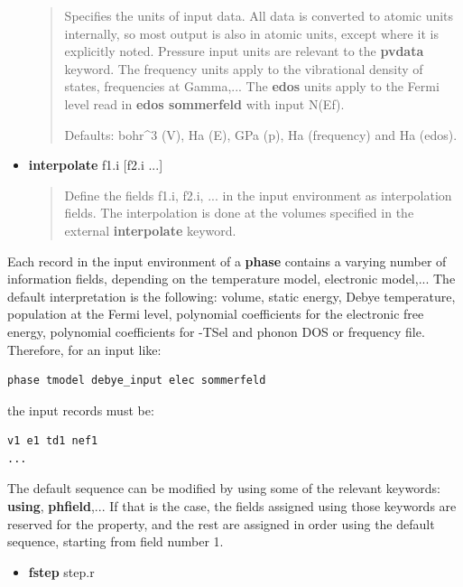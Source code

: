 \documentclass[a4paper]{article}
\begin{document}
\begin{itemize}
\begin{quote}
Specifies the units of input data. All data is converted to atomic
units internally, so most output is also in atomic units, except
where it is explicitly noted. Pressure input units are relevant to
the \textbf{pvdata} keyword. The frequency units apply to the
vibrational density of states, frequencies at Gamma,... The
\textbf{edos} units apply to the Fermi level read in \textbf{edos sommerfeld}
with input N(Ef).

Defaults: bohr\textasciicircum{}3 (V), Ha (E), GPa (p), Ha (frequency) and Ha (edos).

\end{quote}

\item \textbf{interpolate} f1.i {[}f2.i ...{]}
%
\begin{quote}

Define the fields f1.i, f2.i, ... in the input environment as
interpolation fields. The interpolation is done at the volumes
specified in the external \textbf{interpolate} keyword.

\end{quote}

\end{itemize}

Each record in the input environment of a \textbf{phase} contains a varying
number of information fields, depending on the temperature model,
electronic model,... The default interpretation is the following:
volume, static energy, Debye temperature, population at the Fermi
level, polynomial coefficients for the electronic free energy,
polynomial coefficients for -TSel and phonon DOS or frequency
file. Therefore, for an input like:
%
\gibbslist
\begin{lstlisting}
phase tmodel debye_input elec sommerfeld
\end{lstlisting}

the input records must be:
%
\asciilist
\begin{lstlisting}
v1 e1 td1 nef1
...
\end{lstlisting}

The default sequence can be modified by using some of the relevant
keywords: \textbf{using}, \textbf{phfield},... If that is the case, the fields
assigned using those keywords are reserved for the property, and the
rest are assigned in order using the default sequence, starting from
field number 1.
%
\begin{itemize}

\item \textbf{fstep} step.r

\end{itemize}
\end{document}
